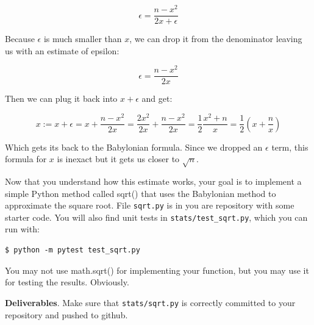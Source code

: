 \begin{fullwidth}
\[
\epsilon = \frac{n - x^2}{2x + \epsilon}
\]

Because $\epsilon$ is much smaller than $x$, we can drop it from the denominator leaving us with an estimate of epsilon:

\[
\epsilon = \frac{n - x^2}{2x}
\]

Then we can plug it back into $x + \epsilon$ and get:

\[
x := x + \epsilon = x + \frac{n - x^2}{2x} = \frac{2x^2}{2x} + \frac{n - x^2}{2x} = \frac{1}{2}\frac{x^2 + n}{x} = \frac{1}{2}(x + \frac{n}{x})
\]

Which gets its back to the Babylonian formula. Since we dropped an $\epsilon$ term, this formula for $x$ is inexact but it gets us closer to $\sqrt{n}$.


Now that you understand how this estimate works, your goal is to implement a simple Python method called sqrt() that uses the Babylonian method to approximate the square root. File {\tt sqrt.py} is in you are repository with some starter code. You will also find unit tests in {\tt stats/test\_sqrt.py}, which you can run with:

\begin{lstlisting}[style=BashInputStyle]
$ python -m pytest test_sqrt.py
\end{lstlisting}

\begin{callout}{\bctakecare}
You may not use math.sqrt() for implementing your function, but you may use it for testing the results.  Obviously.
\end{callout}

\begin{callout}{\bcplume}
{\bf Deliverables}. Make sure that {\tt stats/sqrt.py} is correctly committed to your repository and pushed to github. 
\end{callout}


\end{fullwidth}
